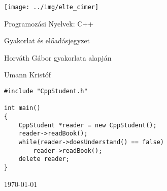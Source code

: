 \documentclass[a4paper,11.5pt, table]{article}
\theoremstyle{definition}
\newcommand{\<}{<\hspace{0mm}<}
\newcommand{\onlyinsubfile}[1]{#1}
\newcommand{\notinsubfile}[1]{}
\begin{document}
	\renewcommand{\onlyinsubfile}[1]{}
	\renewcommand{\notinsubfile}[1]{#1}
	
	\begin{titlepage}
		\vspace*{2cm}
		\centering
		\texttt{[image: ../img/elte\_cimer]}
		
		\vspace*{2cm}
		{\Huge Programozási Nyelvek: C++ }
		
		\vspace{1cm}
		{\huge Gyakorlat és előadásjegyzet}
		
		\vspace*{5mm}
		{\large Horváth Gábor gyakorlata alapján}
		\vspace*{1.5cm}
		
		{\large Umann Kristóf}
		\vfill
		
		\begin{lstlisting}[frame=trbl, linewidth=12.6cm, xleftmargin=4.5cm, emph={CppStudent}]
#include "CppStudent.h"

int main()
{
	CppStudent *reader = new CppStudent();
	reader->readBook();
	while(reader->doesUnderstand() == false)
		reader->readBook();	
	delete reader;
}
		\end{lstlisting}
		\vfill
		
		\vspace*{1cm}
		\today
	\end{titlepage}
	\tableofcontents
	
	
	
	
	
	
	
	
	
	
	
	
\end{document}
